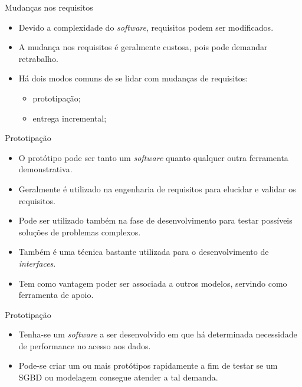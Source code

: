 \documentclass[11pt]{beamer}
\begin{document}
   \begin{frame}{Mudanças nos requisitos}
      \begin{itemize}
         \item Devido a complexidade do \textit{software}, requisitos podem ser modificados.
         \item A mudança nos requisitos é geralmente custosa, pois pode demandar retrabalho.
         \item Há dois modos comuns de se lidar com mudanças de requisitos:
           \begin{itemize}
              \item prototipação;
              \item entrega incremental;
           \end{itemize}
      \end{itemize}
   \end{frame}

   \begin{frame}{Prototipação}
      \begin{itemize}
         \item O protótipo pode ser tanto um \textit{software} quanto qualquer outra ferramenta demonstrativa.
         \item Geralmente é utilizado na engenharia de requisitos para elucidar e validar os requisitos.
         \item Pode ser utilizado também na fase de desenvolvimento para testar possíveis soluções de problemas complexos.
         \item Também é uma técnica bastante utilizada para o desenvolvimento de \textit{interfaces}.
         \item Tem como vantagem poder ser associada a outros modelos, servindo como ferramenta de apoio.
      \end{itemize}
   \end{frame}

	\begin{frame}{Prototipação}
      \begin{itemize}
         \item Tenha-se um \textit{software} a ser desenvolvido em que há determinada necessidade de performance no acesso aos dados.
         \item Pode-se criar um ou mais protótipos rapidamente a fim de testar se um SGBD ou modelagem consegue atender a tal demanda.
      \end{itemize}
   \end{frame}
\end{document}
